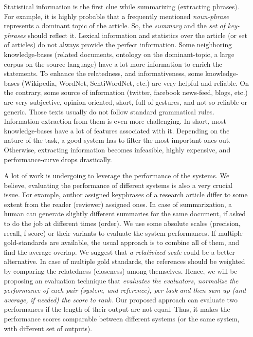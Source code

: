 \documentclass[a4paper]{report}
\begin{document}
\par Statistical information is the first clue while summarizing (extracting phrases). For example, it is highly probable that a frequently mentioned \emph{noun-phrase} represents a dominant topic of the article. So, the \emph{summary} and the \emph{set of key-phrases} should reflect it. Lexical information and statistics over the article (or set of articles) do not always provide the perfect information. Some neighboring knowledge-bases (related documents, ontology on the dominant-topic, a large corpus on the source language) have a lot more information to enrich the statements. To enhance the relatedness, and informativeness, some knowledge-bases (Wikipedia, WordNet, SentiWordNet, etc.) are very helpful and reliable. On the contrary, some source of information (twitter, facebook news-feed, blogs, etc.) are very subjective, opinion oriented, short, full of gestures, and not so reliable or generic. Those texts usually do not follow standard grammatical rules. Information extraction from them is even more challenging. In short, most knowledge-bases have a lot of features associated with it. Depending on the nature of the task, a good system has to filter the most important ones out. Otherwise, extracting information becomes infeasible, highly expensive, and performance-curve drops drastically.\\

 
 \par A lot of work is undergoing to leverage the performance of the systems. We believe, evaluating the performance of different systems is also a very crucial issue. For example, author assigned keyphrases of a research article differ to some extent from the reader (reviewer) assigned ones. In case of summarization, a human can generate slightly different summaries for the same document, if asked to do the job at different times (order). We use some absolute scales (precision, recall, f-score) or their variants to evaluate the system performances. If multiple gold-standards are available, the usual approach is to {combine all of them, and find the average overlap}. We suggest that \emph{a relativized scale} could be a better alternative. In case of multiple gold standards, the references should be weighted by comparing the relatedness (closeness) among themselves. Hence, we will be proposing an evaluation technique that \emph{evaluates the evaluators, normalize the performance of each pair (system, and reference), per task and then sum-up (and average, if needed) the score to rank.} Our proposed approach can evaluate two performances if the length of their output are not equal. Thus, it makes the performance scores comparable between different systems (or the same system, with different set of outputs). \\  
  
\end{document}
